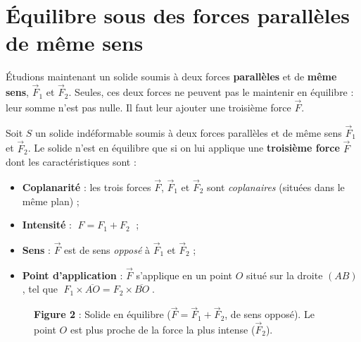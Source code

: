 \documentclass[11pt,a4paper]{article}
\newcommand{\vv}[1]{\vec{#1}}
\begin{document}
\section{Équilibre sous des forces parallèles de même sens}
Étudions maintenant un solide soumis à deux forces \textbf{parallèles} et de \textbf{même sens},
$\vv F_1$ et $\vv F_2$. Seules, ces deux forces ne peuvent pas le maintenir en équilibre : leur
somme n'est pas nulle. Il faut leur ajouter une troisième force $\vv F$.

\begin{theoreme}
Soit $S$ un solide indéformable soumis à deux forces parallèles et de même sens $\vv F_1$ et
$\vv F_2$. Le solide n'est en équilibre que si on lui applique une \textbf{troisième force} $\vv F$
dont les caractéristiques sont :
\begin{itemize}[leftmargin=1.6em,topsep=2pt,itemsep=2pt]
  \item \textbf{Coplanarité} : les trois forces $\vv F$, $\vv F_1$ et $\vv F_2$ sont \emph{coplanaires}
        (situées dans le même plan) ;
  \item \textbf{Intensité} : $\;F = F_1 + F_2\;$ ;
  \item \textbf{Sens} : $\vv F$ est de sens \emph{opposé} à $\vv F_1$ et $\vv F_2$ ;
  \item \textbf{Point d'application} : $\vv F$ s'applique en un point $O$ situé sur la droite $(AB)$,
        tel que $\;F_1\times \overline{AO} = F_2\times \overline{BO}\;$.
\end{itemize}
\end{theoreme}

\begin{figure}[h]
\centering
{}
\caption*{\small\textbf{\textcolor{primary}{Figure 2}} : Solide en équilibre ($\vv F = \vv F_1 + \vv F_2$, de sens opposé). Le point $O$ est plus proche de la force la plus intense ($\vv F_2$).}
\end{figure}
\end{document}
